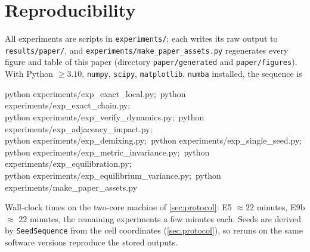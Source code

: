 \section{Reproducibility}
\label{app:repro}
All experiments are scripts in \texttt{experiments/}; each writes its raw output to \texttt{results/paper/}, and \texttt{experiments/make\_paper\_assets.py} regenerates every figure and table of this paper (directory \texttt{paper/generated} and \texttt{paper/figures}). With Python $\ge3.10$, \texttt{numpy}, \texttt{scipy}, \texttt{matplotlib}, \texttt{numba} installed, the sequence is
\begin{center}\small\ttfamily
python experiments/exp\_exact\_local.py;\ python experiments/exp\_exact\_chain.py;\\
python experiments/exp\_verify\_dynamics.py;\ python experiments/exp\_adjacency\_impact.py;\\
python experiments/exp\_demixing.py;\ python experiments/exp\_single\_seed.py;\\
python experiments/exp\_metric\_invariance.py;\ python experiments/exp\_equilibration.py;\\
python experiments/exp\_equilibrium\_variance.py;\ python experiments/make\_paper\_assets.py
\end{center}
Wall-clock times on the two-core machine of \cref{sec:protocol}: E5 $\approx 22$ minutes, E9b $\approx$ 22 minutes, the remaining experiments a few minutes each. Seeds are derived by \texttt{SeedSequence} from the cell coordinates (\cref{sec:protocol}), so reruns on the same software versions reproduce the stored outputs.
